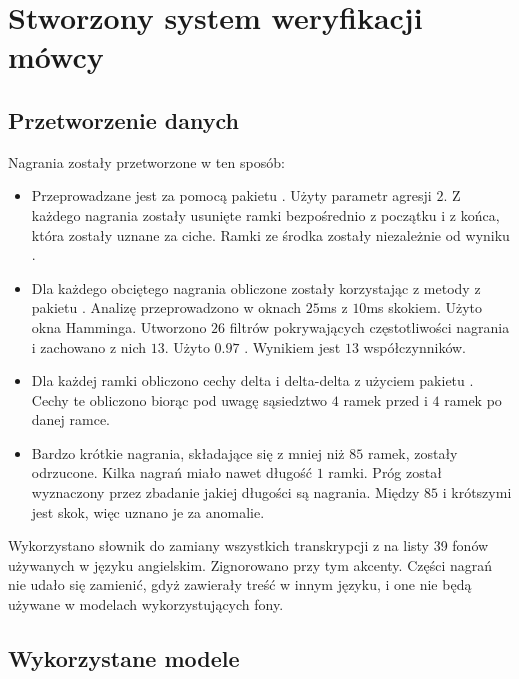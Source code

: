 \chapter{Stworzony system weryfikacji mówcy}\label{chap:badania}

\section{Przetworzenie danych}
\label{sec:data_wrangling}

Nagrania  zostały przetworzone w ten sposób:

\begin{itemize}
    \item Przeprowadzane jest  za pomocą pakietu . Użyty parametr agresji $2$. Z każdego nagrania zostały usunięte ramki bezpośrednio z początku i z końca, która zostały uznane za ciche. Ramki ze środka zostały niezależnie od wyniku .
    \item Dla każdego obciętego nagrania obliczone zostały  korzystając z metody z pakietu . Analizę przeprowadzono w oknach $25$ms z $10$ms skokiem. Użyto okna Hamminga. Utworzono $26$ filtrów pokrywających częstotliwości nagrania i zachowano z nich $13$. Użyto $0.97$ . Wynikiem jest $13$ współczynników.
    \item Dla każdej ramki obliczono cechy delta i delta-delta z użyciem pakietu . Cechy
        te obliczono biorąc pod uwagę sąsiedztwo $4$ ramek przed i $4$ ramek po danej ramce.
    \item Bardzo krótkie nagrania, składające się z mniej niż $85$ ramek, zostały odrzucone. Kilka nagrań miało
        nawet długość $1$ ramki. Próg został wyznaczony przez zbadanie jakiej długości są nagrania. Między $85$
        i krótszymi jest skok, więc uznano je za anomalie.
\end{itemize}

Wykorzystano słownik  do zamiany wszystkich transkrypcji z  na listy 39 fonów
używanych w języku angielskim. Zignorowano przy tym akcenty. Części nagrań nie udało się zamienić, gdyż
zawierały treść w innym języku, i one nie będą używane w modelach wykorzystujących fony.

\section{Wykorzystane modele}
\label{sec:data_models}

